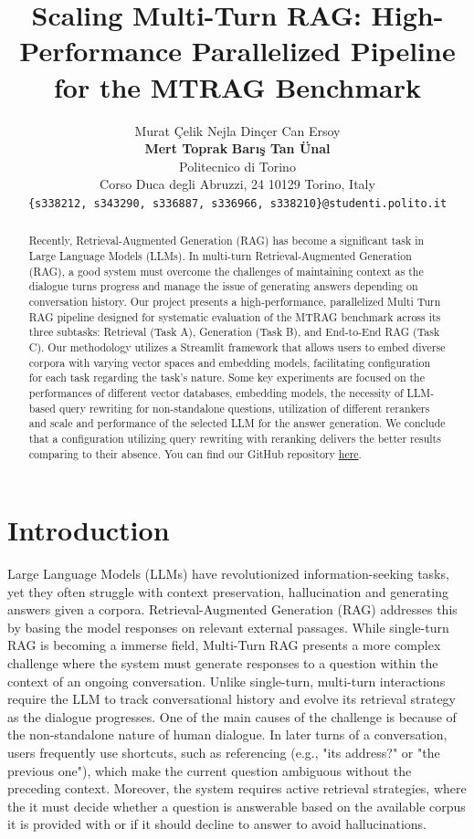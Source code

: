 \documentclass[11pt]{article}
\title{Scaling Multi-Turn RAG: High-Performance Parallelized Pipeline for the MTRAG Benchmark}
\author{Murat Çelik \quad Nejla Dinçer \quad Can Ersoy \\
        \textbf{Mert Toprak} \quad \textbf{Barış Tan Ünal} \\
        Politecnico di Torino \\
        Corso Duca degli Abruzzi, 24 10129 Torino, Italy \\
        \texttt{\{s338212, s343290, s336887, s336966, s338210\}@studenti.polito.it}}
\begin{document}
\maketitle
\begin{abstract}
Recently, Retrieval-Augmented Generation (RAG) has become a significant task in Large Language Models (LLMs). In multi-turn Retrieval-Augmented Generation (RAG), a good system must overcome the challenges of maintaining context as the dialogue turns progress and manage the issue of generating answers depending on conversation history. Our project presents a high-performance, parallelized Multi Turn RAG pipeline designed for systematic evaluation of the MTRAG benchmark across its three subtasks: Retrieval (Task A), Generation (Task B), and End-to-End RAG (Task C). Our methodology utilizes a Streamlit framework that allows users to embed diverse corpora with varying vector spaces and embedding models, facilitating configuration for each task regarding the task’s nature. Some key experiments are focused on the performances of different vector databases, embedding models, the necessity of LLM-based query rewriting for non-standalone questions, utilization of different rerankers and scale and performance of the selected LLM for the answer generation. We conclude that a configuration utilizing query rewriting with reranking delivers the better results comparing to their absence. You can find our GitHub repository \href{https://github.com/merttoprak1/MTRAGEval-Evaluating-Multi-Turn-RAG-Conversations}{here}.
\end{abstract}

\section{Introduction}
Large Language Models (LLMs) have revolutionized information-seeking tasks, yet they often struggle with context preservation, hallucination and generating answers given a corpora. Retrieval-Augmented Generation (RAG) addresses this by basing the model responses on relevant external passages. While single-turn RAG is becoming a immerse field, Multi-Turn RAG presents a more complex challenge where the system must generate responses to a question within the context of an ongoing conversation. Unlike single-turn, multi-turn interactions require the LLM to track conversational history and evolve its retrieval strategy as the dialogue progresses. One of the main causes of the challenge is because of the non-standalone nature of human dialogue. In later turns of a conversation, users frequently use shortcuts, such as referencing (e.g., "its address?" or "the previous one"), which make the current question ambiguous without the preceding context. Moreover, the system requires active retrieval strategies, where the it must decide whether a question is answerable based on the available corpus it is provided with or if it should decline to answer to avoid hallucinations.
\end{document}
